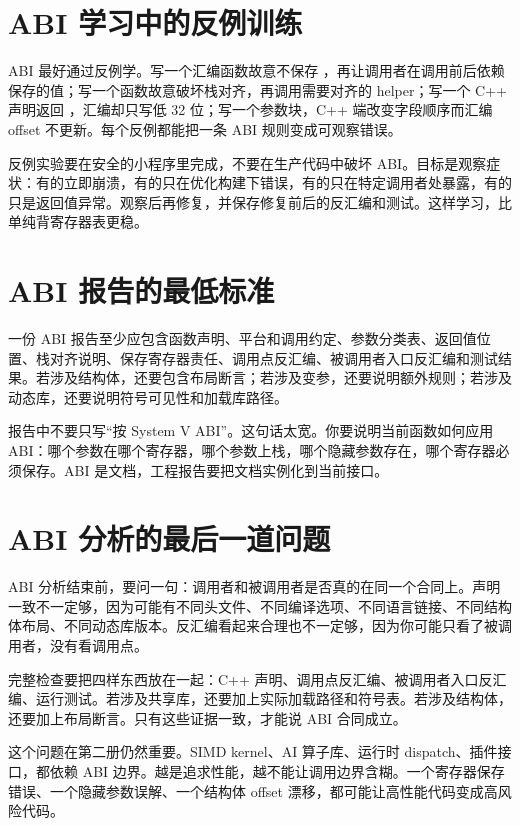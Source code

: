 \section{ABI 学习中的反例训练}

ABI 最好通过反例学。写一个汇编函数故意不保存 ，再让调用者在调用前后依赖  保存的值；写一个函数故意破坏栈对齐，再调用需要对齐的 helper；写一个 C++ 声明返回 ，汇编却只写低 32 位；写一个参数块，C++ 端改变字段顺序而汇编 offset 不更新。每个反例都能把一条 ABI 规则变成可观察错误。

反例实验要在安全的小程序里完成，不要在生产代码中破坏 ABI。目标是观察症状：有的立即崩溃，有的只在优化构建下错误，有的只在特定调用者处暴露，有的只是返回值异常。观察后再修复，并保存修复前后的反汇编和测试。这样学习，比单纯背寄存器表更稳。

\section{ABI 报告的最低标准}

一份 ABI 报告至少应包含函数声明、平台和调用约定、参数分类表、返回值位置、栈对齐说明、保存寄存器责任、调用点反汇编、被调用者入口反汇编和测试结果。若涉及结构体，还要包含布局断言；若涉及变参，还要说明额外规则；若涉及动态库，还要说明符号可见性和加载库路径。

报告中不要只写“按 System V ABI”。这句话太宽。你要说明当前函数如何应用 ABI：哪个参数在哪个寄存器，哪个参数上栈，哪个隐藏参数存在，哪个寄存器必须保存。ABI 是文档，工程报告要把文档实例化到当前接口。

\section{ABI 分析的最后一道问题}

ABI 分析结束前，要问一句：调用者和被调用者是否真的在同一个合同上。声明一致不一定够，因为可能有不同头文件、不同编译选项、不同语言链接、不同结构体布局、不同动态库版本。反汇编看起来合理也不一定够，因为你可能只看了被调用者，没有看调用点。

完整检查要把四样东西放在一起：C++ 声明、调用点反汇编、被调用者入口反汇编、运行测试。若涉及共享库，还要加上实际加载路径和符号表。若涉及结构体，还要加上布局断言。只有这些证据一致，才能说 ABI 合同成立。

这个问题在第二册仍然重要。SIMD kernel、AI 算子库、运行时 dispatch、插件接口，都依赖 ABI 边界。越是追求性能，越不能让调用边界含糊。一个寄存器保存错误、一个隐藏参数误解、一个结构体 offset 漂移，都可能让高性能代码变成高风险代码。

